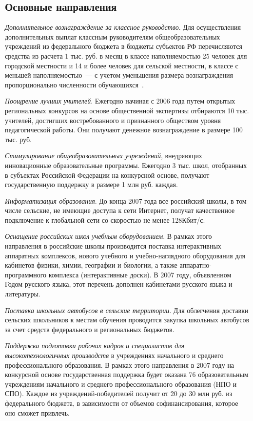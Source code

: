 \documentclass[article, 12pt, russian, oneside]{ncc}
\begin{document}
\subsection{Основные направления}

\emph{Дополнительное вознаграждение за классное руководство}. Для
осуществления дополнительных выплат классным руководителям
общеобразовательных учреждений из федерального бюджета в бюджеты
субъектов РФ перечисляются средства из расчета 1 тыс. руб. в месяц в
классе наполняемостью 25 человек для городской местности и 14 и более
человек для сельской местности, в классе с меньшей наполняемостью~---
с учетом уменьшения размера вознаграждения пропорционально численности
обучающихся~\cite{Edu_Goals}.

\emph{Поощрение лучших учителей}. Ежегодно начиная с 2006 года путем
открытых региональных конкурсов на основе общественной экспертизы
отбираются 10 тыс. учителей, достигших востребованного и признанного
обществом уровня педагогической работы. Они получают денежное
вознаграждение в размере 100 тыс. руб.

\emph{Стимулирование общеобразовательных учреждений}, внедряющих
инновационные образовательные программы. Ежегодно 3 тыс. школ,
отобранных в субъектах Российской Федерации на конкурсной основе,
получают государственную поддержку в размере 1 млн руб. каждая.

\emph{Информатизация образования}. До конца 2007 года все российский
школы, в том числе сельские, не имеющие доступа к сети Интернет,
получат качественное подключение к глобальной сети со скоростью не
менее 128Кбит/с.

\emph{ Оснащение российских школ учебным оборудованием}. В рамках
этого направления в российские школы производится поставка
интерактивных аппаратных комплексов, нового учебного и
учебно-наглядного оборудования для кабинетов физики, химии, географии
и биологии, а также аппаратно-программного комплекса (интерактивные
доски). В 2007 году, объявленном Годом русского языка, этот перечень
дополнен кабинетами русского языка и литературы.

\emph{Поставка школьных автобусов в сельские территории}. Для
облегчения доставки сельских школьников к местам обучения проводится
закупка школьных автобусов за счет средств федерального и региональных
бюджетов.

\emph{Поддержка подготовки рабочих кадров и специалистов для
  высокотехнологичных производств} в учреждениях начального и среднего
профессионального образования. В рамках этого направления в 2007 году
на конкурсной основе государственная поддержка будет оказана 76
образовательным учреждениям начального и среднего профессионального
образования (НПО и СПО). Каждое из учреждений-победителей получит от
20 до 30 млн руб. из федерального бюджета, в зависимости от объемов
софинансирования, которое оно сможет привлечь.
\end{document}
